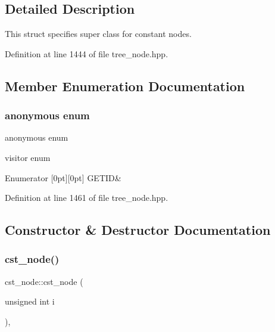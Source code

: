 \subsection{Detailed Description}
This struct specifies super class for constant nodes. 

Definition at line 1444 of file tree\+\_\+node.\+hpp.



\subsection{Member Enumeration Documentation}
\mbox{\label{structcst__node_af089f8f7c8f9a43e50fa5f274f22598d}} 
\subsubsection{\texorpdfstring{anonymous enum}{anonymous enum}}
{\footnotesize\ttfamily anonymous enum}



visitor enum 

\begin{DoxyEnumFields}{Enumerator}
[0pt][0pt]{}\mbox{\label{structcst__node_af089f8f7c8f9a43e50fa5f274f22598da568b4042a46a8dc7f682e1e090efe1a7}} 
G\+E\+T\+ID&\\
\hline

\end{DoxyEnumFields}


Definition at line 1461 of file tree\+\_\+node.\+hpp.



\subsection{Constructor \& Destructor Documentation}
\mbox{\label{structcst__node_a034c48a5307b1177a1c3c9f1c7bf80af}} 
\subsubsection{\texorpdfstring{cst\+\_\+node()}{cst\_node()}}
{\footnotesize\ttfamily cst\+\_\+node\+::cst\+\_\+node (\begin{DoxyParamCaption}\item[{unsigned int}]{i }\end{DoxyParamCaption})\hspace{0.3cm}{\ttfamily [inline]}, {\ttfamily [explicit]}}



